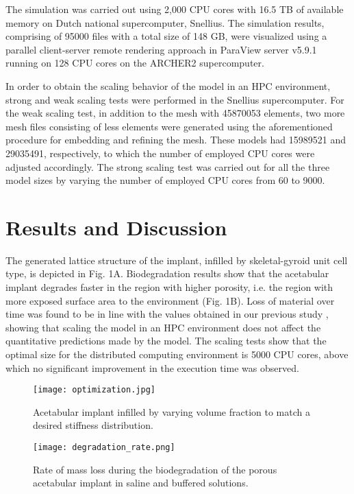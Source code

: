 The simulation was carried out using 2,000 CPU cores with 16.5 TB of available memory on Dutch national supercomputer, Snellius. The simulation results, comprising of \num{95000} files with a total size of 148 GB, were visualized using a parallel client-server remote rendering approach in ParaView server v5.9.1 running on 128 CPU cores on the ARCHER2 supercomputer. 

In order to obtain the scaling behavior of the model in an HPC environment, strong and weak scaling tests were performed in the Snellius supercomputer. For the weak scaling test, in addition to the mesh with \num{45870053} elements, two more mesh files consisting of less elements were generated using the aforementioned procedure for embedding and refining the mesh. These models had \num{15989521} and \num{29035491}, respectively, to which the number of employed CPU cores were adjusted accordingly. The strong scaling test was carried out for all the three model sizes by varying the number of employed CPU cores from 60 to \num{9000}. 


\section{Results and Discussion}

The generated lattice structure of the implant, infilled by skeletal-gyroid unit cell type, is depicted in Fig. 1A. Biodegradation results show that the acetabular implant degrades faster in the region with higher porosity, i.e. the region with more exposed surface area to the environment (Fig. 1B). Loss of material over time was found to be in line with the values obtained in our previous study \cite{Barzegari2021}, showing that scaling the model in an HPC environment does not affect the quantitative predictions made by the model.  The scaling tests show that the optimal size for the distributed computing environment is \num{5000} CPU cores, above which no significant improvement in the execution time was observed.

\begin{figure}[h]
\centering
\medskip
\texttt{[image: optimization.jpg]}
\caption[Infilled acetabular implant]{Acetabular implant infilled by varying volume fraction to match a desired stiffness distribution.} \label{fig:cup_optimization}
\end{figure}

\begin{figure}[h]
\centering
\medskip
\texttt{[image: degradation\_rate.png]}
\caption[Biodegradation rate for the acetabular implant]{Rate of mass loss during the biodegradation of the porous acetabular implant in saline and buffered solutions.} \label{fig:cup_degradation_rate}
\end{figure}

